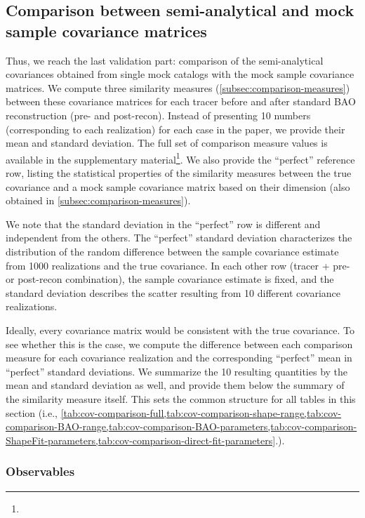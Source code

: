 \subsection{Comparison between semi-analytical and mock sample covariance matrices}
\label{sec:cov-comparison-results}

Thus, we reach the last validation part: comparison of the semi-analytical covariances obtained from single mock catalogs with the mock sample covariance matrices.
We compute three similarity measures (\cref{subsec:comparison-measures}) between these covariance matrices for each tracer before and after standard BAO reconstruction (pre- and post-recon).
Instead of presenting 10 numbers (corresponding to each \rascalc{} realization) for each case in the paper, we provide their mean and standard deviation.
The full set of comparison measure values is available in the supplementary material\footnote{\supplementarylink{}}.
We also provide the ``perfect'' reference row, listing the statistical properties of the similarity measures between the true covariance and a mock sample covariance matrix based on their dimension (also obtained in \cref{subsec:comparison-measures}).

We note that the standard deviation in the ``perfect'' row is different and independent from the others.
The ``perfect'' standard deviation characterizes the distribution of the random difference between the sample covariance estimate from 1000 realizations and the true covariance.
In each other row (tracer + pre- or post-recon combination), the sample covariance estimate is fixed, and the standard deviation describes the scatter resulting from 10 different \rascalc{} covariance realizations.

Ideally, every \rascalc{} covariance matrix would be consistent with the true covariance.
To see whether this is the case, we compute the difference between each comparison measure for each \rascalc{} covariance realization and the corresponding ``perfect'' mean in ``perfect'' standard deviations.
We summarize the 10 resulting quantities by the mean and standard deviation as well, and provide them below the summary of the similarity measure itself.
This sets the common structure for all tables in this section (i.e., \cref{tab:cov-comparison-full,tab:cov-comparison-shape-range,tab:cov-comparison-BAO-range,tab:cov-comparison-BAO-parameters,tab:cov-comparison-ShapeFit-parameters,tab:cov-comparison-direct-fit-parameters}.).

\subsubsection{Observables}
\label{sec:cov-comparison-obs}

